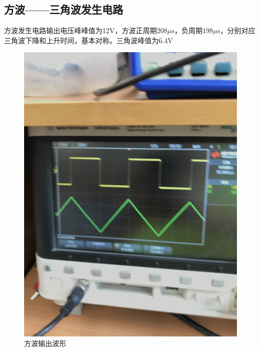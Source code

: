 \documentclass[UTF8,a4paper]{paper}
\begin{document}
\begin{multicols}{2}
\subsection{方波——三角波发生电路}
方波发生电路输出电压峰峰值为12V，方波正周期$208\mu\mathrm{s}$，负周期$198\mu\mathrm{s}$，分别对应三角波下降和上升时间，基本对称。三角波峰值为6.4V
\begin{figure}[H]
\centering
\includegraphics[width=\columnwidth,angle=-90]{wave/IMG_0643.jpg}
\caption{方波输出波形}
\label{3}
\end{figure}
\end{multicols}
\end{document}

